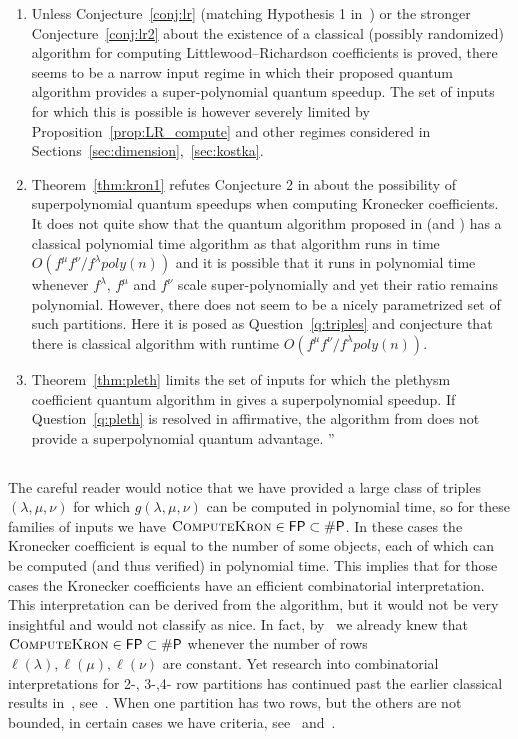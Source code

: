 \documentclass[11pt]{amsart}
\theoremstyle{plain}
\theoremstyle{definition}
\numberwithin{equation}{section}
\newcommand{\la}{\lambda}
\def\FP{{\rm{\textsf{FP}}}}
\def\SP{{{\rm{\textsf{\#P}}}}}
\def\FP{{{}\rm{\textsf{FP}} }}
\newcommand{\poly}{poly}
\def\la{\lambda}
\begin{document}
\begin{enumerate}
\item Unless Conjecture~\ref{conj:lr} (matching Hypothesis 1 in~\cite{LH24}) or the stronger Conjecture~\ref{conj:lr2} about the existence of a classical (possibly randomized) algorithm for computing Littlewood--Richardson coefficients is proved, there seems to be a narrow input regime in which their proposed quantum algorithm provides a super-polynomial quantum speedup. The set of inputs for which this is possible is however severely limited by Proposition~\ref{prop:LR_compute} and other regimes considered in Sections~\ref{sec:dimension},~\ref{sec:kostka}.

\item Theorem~\ref{thm:kron1} refutes Conjecture 2 in \cite{LH24} about the possibility of superpolynomial quantum speedups when computing Kronecker coefficients. It does not quite show that the quantum algorithm proposed in \cite{LH24}(and \cite{bravyi2024quantum}) has a classical polynomial time algorithm as that algorithm runs in time $O(f^\mu f^\nu/ f^\lambda \poly(n))$ and it is possible that it runs in polynomial time whenever $f^\lambda$, $f^\mu$ and $f^\nu$ scale super-polynomially and yet their ratio remains polynomial. However, there does not seem to be a nicely parametrized set of such partitions. Here it is posed  as Question~\ref{q:triples} and conjecture that there is classical algorithm with runtime $O(f^\mu f^\nu/ f^\lambda \poly(n))$. 

\item Theorem~\ref{thm:pleth} limits the set of inputs for which the plethysm coefficient quantum algorithm in \cite{LH24} gives a superpolynomial speedup. If Question~\ref{q:pleth} is resolved in affirmative, the algorithm from \cite{LH24} does not provide a superpolynomial quantum advantage. ''

\end{enumerate}

\subsection{} The careful reader would notice that we have provided a large class of triples $(\la,\mu,\nu)$ for which $g(\la,\mu,\nu)$ can be computed in polynomial time, so for these families of inputs we have $\textsc{ComputeKron} \in \FP \subset \SP$. In these cases the Kronecker coefficient is equal to the number of some objects, each of which can be computed (and thus verified) in polynomial time. This implies that for those cases the Kronecker coefficients have an efficient combinatorial interpretation. This interpretation can be derived from the algorithm, but it would not be very insightful and would not classify as nice. In fact, by~\cite{CDW,PPcomp} we already knew that $\textsc{ComputeKron} \in \FP \subset \SP$ whenever the number of rows $\ell(\la),\ell(\mu),\ell(\nu)$ are constant. Yet research into combinatorial interpretations for 2-, 3-,4- row partitions has continued past the earlier classical results in~\cite{rosas2001kronecker}, see~\cite{BMS,mishna2021vector,mishna2022estimating}. When one partition has two rows, but the others are not bounded, in certain cases we have criteria, see~\cite{ballantine2005kronecker} and~\cite{PPu}. 
\end{document}
